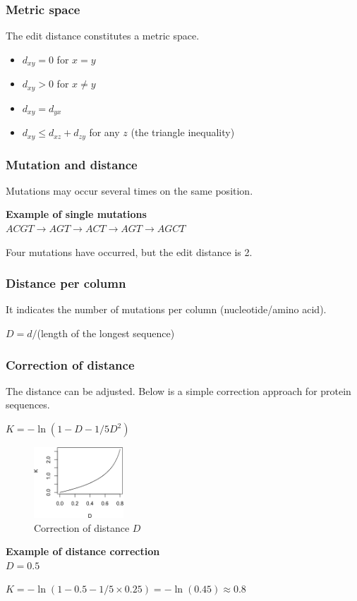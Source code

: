 %
%
\subsubsection*{Metric space}
The edit distance constitutes a metric space.
\begin{itemize}
\item $d_{xy} = 0$ for $x = y$ 
\item $d_{xy} > 0$ for $x \neq y$
\item $d_{xy} = d_{yx}$
\item $d_{xy} \leq d_{xz} + d_{zy}$ for any $z$ (the triangle inequality)
\end{itemize}

%
%
\subsubsection*{Mutation and distance}
Mutations may occur several times on the same position.

\medskip 
\noindent
\textbf{Example of single mutations} \\

\noindent
$ACGT \rightarrow AGT \rightarrow ACT \rightarrow AGT \rightarrow AGCT$

\medskip 
\noindent
Four mutations have occurred, but the edit distance is 2.

%
%
\subsubsection*{Distance per column}
It indicates the number of mutations per column (nucleotide/amino acid).

\bigskip 
$D = d / $(length of the longest sequence)

%
%
\subsubsection*{Correction of distance}
The distance can be adjusted. Below is a simple correction approach for protein sequences.

\bigskip 
$K=-\ln⁡(1-D-1/5 D^2 )$
\begin{figure}[H]
  \centering
      \includegraphics[width=0.3\textwidth]{fig03/adjust_distance.png}
      \caption{Correction of distance $D$}
\end{figure}

\medskip 
\noindent
\textbf{Example of distance correction} \\

$D = 0.5$

$K = -\ln⁡(1 - 0.5 - 1/5  \times 0.25 ) = -\ln(0.45) \approx 0.8⁡$

%

